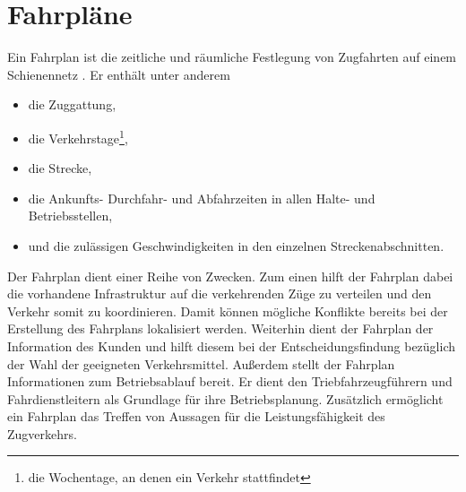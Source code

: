 \section{Fahrpläne}

Ein Fahrplan ist die zeitliche und räumliche Festlegung von Zugfahrten auf einem Schienennetz \cite{groger_simulation_2002}. Er enthält unter anderem
\begin{itemize}
    \item die Zuggattung,
    \item die Verkehrstage\footnote{die Wochentage, an denen ein Verkehr stattfindet},
    \item die Strecke,
    \item die Ankunfts- Durchfahr- und Abfahrzeiten in allen Halte- und Betriebsstellen,
    \item und die zulässigen Geschwindigkeiten in den einzelnen Streckenabschnitten.
\end{itemize}
Der Fahrplan dient einer Reihe von Zwecken. Zum einen hilft der Fahrplan dabei die vorhandene Infrastruktur auf die verkehrenden Züge zu verteilen und den Verkehr somit zu koordinieren. Damit können mögliche Konflikte bereits bei der Erstellung des Fahrplans lokalisiert werden. Weiterhin dient der Fahrplan der Information des Kunden und hilft diesem bei der Entscheidungsfindung bezüglich der Wahl der geeigneten Verkehrsmittel. Außerdem stellt der Fahrplan Informationen zum Betriebsablauf bereit. Er dient den Triebfahrzeugführern und Fahrdienstleitern als Grundlage für ihre Betriebsplanung. Zusätzlich ermöglicht ein Fahrplan das Treffen von Aussagen für die Leistungsfähigkeit des Zugverkehrs. \cite{groger_simulation_2002}

